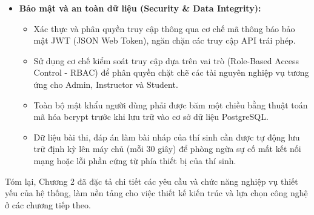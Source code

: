 \documentclass[../DoAn.tex]{subfiles}
\begin{document}
\begin{itemize}
    \item \textbf{Bảo mật và an toàn dữ liệu (Security \& Data Integrity):}
    \begin{itemize}
        \item Xác thực và phân quyền truy cập thông qua cơ chế mã thông báo bảo mật JWT (JSON Web Token), ngăn chặn các truy cập API trái phép.
        \item Sử dụng cơ chế kiểm soát truy cập dựa trên vai trò (Role-Based Access Control - RBAC) để phân quyền chặt chẽ các tài nguyên nghiệp vụ tương ứng cho Admin, Instructor và Student.
        \item Toàn bộ mật khẩu người dùng phải được băm một chiều bằng thuật toán mã hóa bcrypt trước khi lưu trữ vào cơ sở dữ liệu PostgreSQL.
        \item Dữ liệu bài thi, đáp án làm bài nháp của thí sinh cần được tự động lưu trữ định kỳ lên máy chủ (mỗi 30 giây) để phòng ngừa sự cố mất kết nối mạng hoặc lỗi phần cứng từ phía thiết bị của thí sinh.
    \end{itemize}
\end{itemize}

Tóm lại, Chương 2 đã đặc tả chi tiết các yêu cầu và chức năng nghiệp vụ thiết yếu của hệ thống, làm nền tảng cho việc thiết kế kiến trúc và lựa chọn công nghệ ở các chương tiếp theo.
\end{document}
